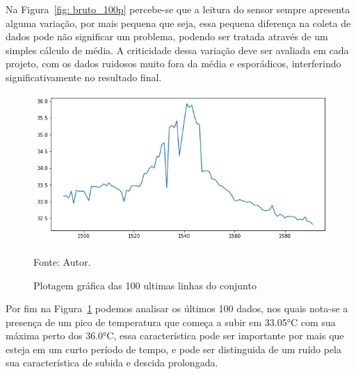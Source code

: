 Na Figura~\ref{fig: bruto_100p} percebe-se que a leitura do sensor sempre apresenta alguma variação, por mais pequena que seja, essa pequena diferença na coleta de dados pode não significar um problema, podendo ser tratada através de um simples cálculo de média. A criticidade dessa variação deve ser avaliada em cada projeto, com os dados ruidosos muito fora da média e esporádicos, interferindo significativamente no resultado final.

\begin{figure}[H]
	\centering
	\includegraphics[width=15cm]{imagens/sensores/bruto_100_ultimas.png}
	\caption{Plotagem gráfica das 100 ultimas linhas do conjunto}
	Fonte: Autor.
	\label{fig: bruto_100u}
\end{figure}

Por fim na Figura~\ref{fig: bruto_100u} podemos analisar os últimos 100 dados, nos quais nota-se a presença de um pico de temperatura que começa a subir em \ang{33.05}C com sua máxima perto dos \ang{36.0}C, essa característica pode ser importante por mais que esteja em um curto período de tempo, e pode ser distinguida de um ruído pela sua característica de subida e descida prolongada. 



